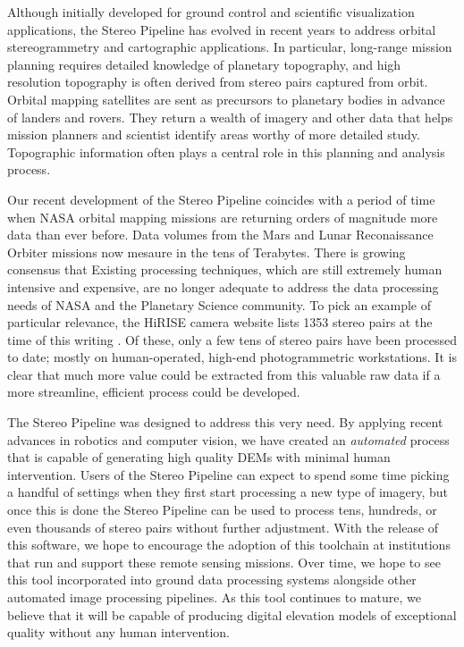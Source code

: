 Although initially developed for ground control and scientific
visualization applications, the Stereo Pipeline has evolved in recent
years to address orbital stereogrammetry and cartographic
applications.  In particular, long-range mission planning requires
detailed knowledge of planetary topography, and high resolution
topography is often derived from stereo pairs captured from orbit.
Orbital mapping satellites are sent as precursors to planetary bodies
in advance of landers and rovers.  They return a wealth of imagery and
other data that helps mission planners and scientist identify areas
worthy of more detailed study. Topographic information often plays a
central role in this planning and analysis process.

Our recent development of the Stereo Pipeline coincides with a period
of time when NASA orbital mapping missions are returning orders of
magnitude more data than ever before.  Data volumes from the Mars and
Lunar Reconaissance Orbiter missions now mesaure in the tens of
Terabytes.  There is growing consensus that Existing processing
techniques, which are still extremely human intensive and expensive,
are no longer adequate to address the data processing needs of NASA
and the Planetary Science community.  To pick an example of particular
relevance, the HiRISE camera website lists 1353 stereo pairs at the
time of this writing \cite{HiRISE_website}.  Of these, only a few tens
of stereo pairs have been processed to date; mostly on human-operated,
high-end photogrammetric workstations.  It is clear that much more
value could be extracted from this valuable raw data if a more
streamline, efficient process could be developed.

The Stereo Pipeline was designed to address this very need.  By
applying recent advances in robotics and computer vision, we have
created an {\em automated} process that is capable of generating high
quality DEMs with minimal human intervention.  Users of the Stereo
Pipeline can expect to spend some time picking a handful of settings
when they first start processing a new type of imagery, but once this
is done the Stereo Pipeline can be used to process tens, hundreds, or
even thousands of stereo pairs without further adjustment.  With the
release of this software, we hope to encourage the adoption of this
toolchain at institutions that run and support these remote sensing
missions.  Over time, we hope to see this tool incorporated into
ground data processing systems alongside other automated image
processing pipelines.  As this tool continues to mature, we believe
that it will be capable of producing digital elevation models of
exceptional quality without any human intervention.

